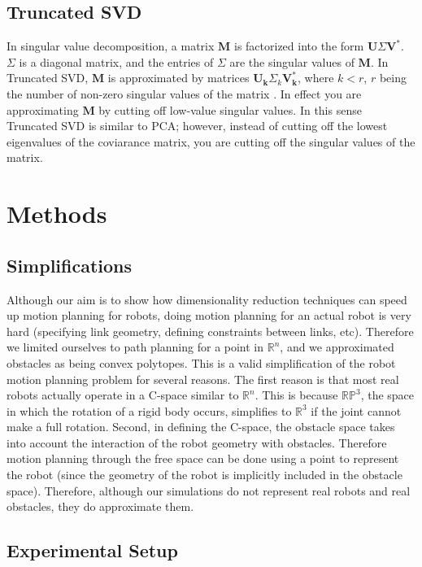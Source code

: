 \documentclass[12pt]{article}
\begin{document}
\subsection{Truncated SVD}

In singular value decomposition, a matrix $\mathbf{M}$ is factorized into the
form $\mathbf{U} \Sigma \mathbf{V^*}$. $\Sigma$ is a diagonal matrix, and the
entries of $\Sigma$ are the singular values of $\mathbf{M}$. In Truncated SVD,
$\mathbf{M}$ is approximated by matrices $\mathbf{U_k} \Sigma_k
\mathbf{V^*_k}$, where $ k < r $, $r$ being the number of non-zero singular
values of the matrix \cite{maciejewski1989svd}. In effect you are approximating
$\mathbf{M}$ by cutting off low-value singular values. In this sense Truncated
SVD is similar to PCA; however, instead of cutting off the lowest eigenvalues
of the coviarance matrix, you are cutting off the singular values of the
matrix.

\section{Methods}

\subsection{Simplifications}

Although our aim is to show how dimensionality reduction techniques can speed
up motion planning for robots, doing motion planning for an actual robot is
very hard (specifying link geometry, defining constraints between links, etc).
Therefore we limited ourselves to path planning for a point in $\mathbb{R}^n$,
and we approximated obstacles as being convex polytopes. This is a valid
simplification of the robot motion planning problem for several reasons. The
first reason is that most real robots actually operate in a C-space similar to
$\mathbb{R}^n$. This is because $\mathbb{RP}^3$, the space in which the
rotation of a rigid body occurs, simplifies to $\mathbb{R}^3$ if the joint
cannot make a full rotation. Second, in defining the C-space, the obstacle
space takes into account the interaction of the robot geometry with obstacles.
Therefore motion planning through the free space can be done using a point to
represent the robot (since the geometry of the robot is implicitly included in
the obstacle space). Therefore, although our simulations do not represent real
robots and real obstacles, they do approximate them.

\subsection{Experimental Setup}
\end{document}
